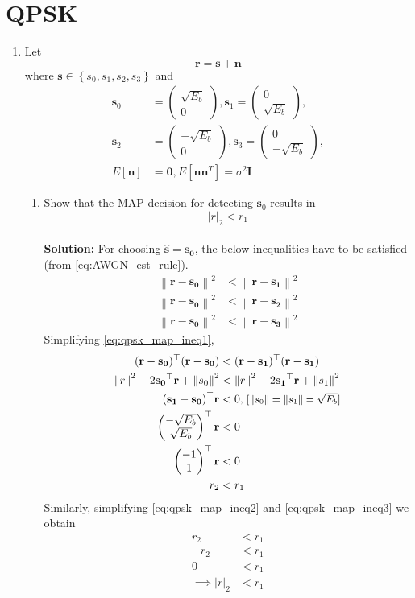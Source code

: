 \documentclass[journal,8pt,onecolumn]{IEEEtran}
\providecommand{\sbrak}[1]{\ensuremath{{}\left[#1\right]}}
\providecommand{\cbrak}[1]{\ensuremath{\left\{#1\right\}}}
\providecommand{\abs}[1]{\left\vert#1\right\vert}
\providecommand{\norm}[1]{\left\lVert#1\right\rVert}
\newcommand{\solution}{\noindent \textbf{Solution: }}
\newcommand{\myvec}[1]{\ensuremath{\begin{pmatrix}#1\end{pmatrix}}}
\let\vec\mathbf
\begin{document}
\section{QPSK}
\begin{enumerate}
\item
Let
\begin{equation}
\mathbf{r} = \mathbf{s}+ \mathbf{n}
\end{equation}
where $\mathbf{s} \in \cbrak{s_0,s_1,s_2, s_3}$ and
\begin{align}
\mathbf{s}_0 &= 
\myvec{
\sqrt{E_b}\\
0
},
\mathbf{s}_1 = 
\myvec{
0\\
\sqrt{E_b}
},
\\
\mathbf{s}_2 &= 
\myvec{
-\sqrt{E_b}\\
0
},
\mathbf{s}_3 = 
\myvec{
0\\
-\sqrt{E_b}
},
\\
E\sbrak{\mathbf{n}} &= \mathbf{0}, E\sbrak{\mathbf{n}\mathbf{n}^T} = \sigma^2 \mathbf{I}
\end{align}
%
\begin{enumerate}[label=(\alph{enumii})]
\item Show that the MAP decision for detecting $\mathbf{s}_0$ results in
\begin{equation}
\abs{r}_2 < r_1
\end{equation}\\
\solution For choosing $\vec{\hat{s}} = \vec{s_0}$, the below inequalities have to be satisfied (from \eqref{eq:AWGN_est_rule}).
\begin{align}
	\label{eq:qpsk_map_ineq1}
	\norm{\vec{r}-\vec{s_0}}^2 &< \norm{\vec{r}-\vec{s_1}}^2	\\
	\label{eq:qpsk_map_ineq2}
	\norm{\vec{r}-\vec{s_0}}^2 &< \norm{\vec{r}-\vec{s_2}}^2	\\
	\label{eq:qpsk_map_ineq3}
	\norm{\vec{r}-\vec{s_0}}^2 &< \norm{\vec{r}-\vec{s_3}}^2	
\end{align} 
Simplifying \eqref{eq:qpsk_map_ineq1},
\begin{align*}
	(\vec{r}-\vec{s_0})^{\top}(\vec{r}-\vec{s_0}) &< (\vec{r}-\vec{s_1})^{\top}(\vec{r}-\vec{s_1})\\
	\norm{r}^2 -2\vec{s_0}^{\top}\vec{r} + \norm{s_0}^2 &< \norm{r}^2 -2\vec{s_1}^{\top}\vec{r} + \norm{s_1}^2\\
	(\vec{s_1}-\vec{s_0})^{\top}\vec{r} &< 0 \text{\small,   $[\norm{s_0} = \norm{s_1} = \sqrt{E_b}$]}\\
	\myvec{-\sqrt{E_b}\\\sqrt{E_b}}^{\top}\vec{r} &< 0\\
	\myvec{-1\\1}^{\top}\vec{r} &< 0\\
	r_2 &< r_1
\end{align*}
Similarly, simplifying \eqref{eq:qpsk_map_ineq2} and \eqref{eq:qpsk_map_ineq3} we obtain
\begin{align*}
	r_2 &< r_1	\\
	-r_2 &< r_1 \\
	0 &< r_1	\\
	\implies \abs{r}_2 &< r_1
\end{align*} 


\end{enumerate}
\end{enumerate}
\end{document}
